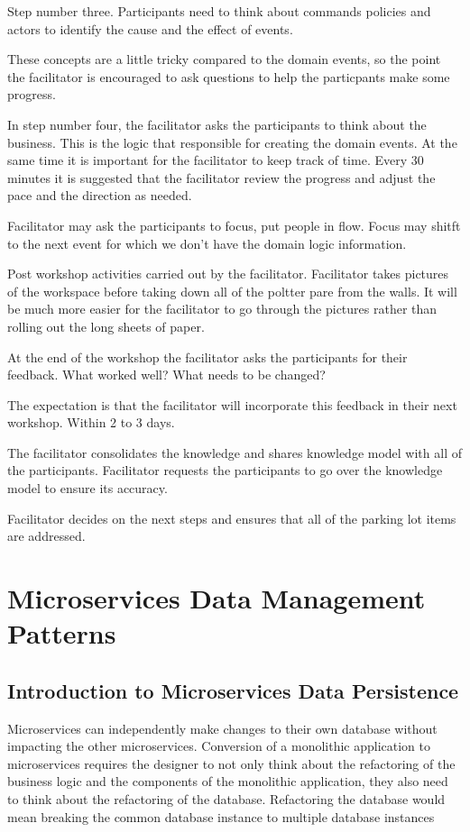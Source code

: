 Step number three.
Participants need to think about commands policies and actors to identify the cause and the effect of events.

These concepts are a little tricky compared to the domain events, so the point the facilitator is encouraged to ask questions to help the particpants make some progress.

In step number four, the facilitator asks the participants to think about the business.
This is the logic that responsible for creating the domain events.
At the same time it is important for the facilitator to keep track of time.
Every 30 minutes it is suggested that the facilitator review the progress and adjust the pace and the direction as needed.

Facilitator may ask the participants to focus, put people in flow.
Focus may shitft to the next event for which we don't have the domain logic information.

Post workshop activities carried out by the facilitator.
Facilitator takes pictures of the workspace before taking down all of the poltter pare from the walls.
It will be much more easier for the facilitator to go through the pictures rather than rolling out the long sheets of paper.

At the end of the workshop the facilitator asks the participants for their feedback.
What worked well?
What needs to be changed?

The expectation is that the facilitator will incorporate this feedback in their next workshop.
Within 2 to 3 days.

The facilitator consolidates the knowledge and shares knowledge model with all of the participants.
Facilitator requests the participants to go over the knowledge model to ensure its accuracy.

Facilitator decides on the next steps and ensures that all of the parking lot items are addressed.


\chapter{Microservices Data Management Patterns}

\section{Introduction to Microservices Data Persistence}
Microservices can independently make changes to their own database without impacting the other microservices.
Conversion of a monolithic application to microservices requires the designer to not only think about the refactoring of the business logic and the components of the monolithic application,
they also need to think about the refactoring of the database.
Refactoring the database would mean breaking the common database instance to multiple database instances

